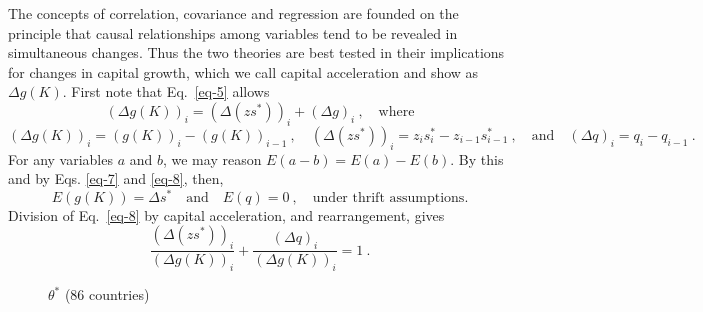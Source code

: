 \documentclass[a4paper,fleqn]{latex_styles/cas-sc}
\begin{document}
The concepts of correlation, covariance and regression are founded on the principle that causal relationships among variables tend to be revealed in simultaneous changes. Thus the two theories are best tested in their
implications for changes in capital growth, which we call capital acceleration and show as $\Delta g(K)$. First note that Eq.~\eqref{eq-5} allows
%
\begin{equation}
    (\Delta g (K))_{i} = (\Delta(z s^*))_{i} + (\Delta g)_{i}\ , \quad \text{where}\label{eq-8}
\end{equation}
%
\[(\Delta g{(K)})_{i} = (g{(K)})_{i} - (g(K))_{i - 1} \ , \quad
     (\Delta (z s^{*}))_{i} = z_i s^{*}_{i} - z_{i-1} s^{*}_{i - 1} \ , \quad \text{and} \quad
(\Delta q)_{i} = q_{i} - q_{i - 1} \ .\]
%
For any variables \(a\) and \(b\), we may reason
\(E(a - b) = E(a) - E(b)\). By this and by Eqs. \eqref{eq-7} and
\eqref{eq-8}, then,
%
\begin{equation}
    E(g(K)) = \Delta s^* \quad \text{and} \quad E(q) = 0\ , \quad \text{under thrift assumptions.}\label{eq-9}
\end{equation}
%
Division of Eq.~\eqref{eq-8} by capital acceleration, and rearrangement,
gives
%
\begin{equation}
\frac{(\Delta(z s^{*}))_{i}}{(\Delta g{(K)})_{i}} + \frac{(\Delta q)_{i}}{(\Delta g{(K)})_{i}} = 1 \ .\label{eq-10}
\end{equation}
%
\FloatBarrier
\begin{figure}[pos=H]
    \centering
    \captionsetup{justification=centering}
    \caption{\(\theta^*\) (86 countries)} %
    \label{fig-s_c_theta_plots}
\end{figure}
\end{document}
